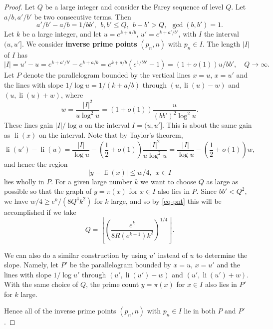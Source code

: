 \documentclass[10pt]{article}
\theoremstyle{definition}
\theoremstyle{remark}
\numberwithin{equation}{section}
\DeclareMathOperator{\li}{li}
\begin{document}
\begin{proof}
Let $Q$ be a large integer and
consider the Farey sequence of
level $Q$.  Let $a/b, a'/b'$ be two consecutive terms.  Then
\[
a'/b'-a/b = 1/bb',~~b,b'\le Q,~~b+b'>Q,~~\gcd(b,b')=1.
\]
Let $k$ be a large integer, and let
 $u=e^{k+a/b},\,u'=e^{k+a'/b'}$, with $I$ the interval $(u,u']$.  We consider \textbf{inverse prime points} $(p_n,n)$
with $p_n\in I$.   The length $|I|$ of $I$ has
\[
|I|=u'-u=e^{k+a'/b'}-e^{k+a/b}=e^{k+a/b}(e^{1/bb'}-1)=(1+o(1))u/bb', \quad Q\to\infty.
\]
Let $P$ denote the parallelogram bounded by the vertical lines $x=u,\, x=u'$
and the lines with slope $1/\log u=1/(k+a/b)$ through $(u, \li(u)-w)$ and $(u,\li(u)+w)$,
where
\[
w=\frac{|I|^2}{u\log^2u}=(1+o(1))\frac u{(bb')^2\log^2u}.
\]
These lines gain $|I|/\log u$ on the interval $I = (u,u']$.  This is about the same gain as
$\li(x)$ on the interval.  Note that by Taylor's theorem,
\[
\li(u')-\li(u)=\frac{|I|}{\log u}-\left(\frac12+o(1)\right)\frac{|I|^2}{u\log^2 u}=\frac{|I|}{\log u}-\left(\frac12+o(1)\right)w,
\]
and hence the region
\[
    |y-\li(x)|\le w/4,~~x\in I
\]
lies wholly in $P$.
For a given large number $k$ we want to choose $Q$ as large as possible so that the graph of $y=\pi(x)$ for $x\in I$ also lies in $P$.
Since $bb'<Q^2$, we have $w/4 \geq e^k / (8Q^4 k^2)$ for $k$ large, and so by \eqref{eq-pnt} this will be accomplished if we take
\[
Q=\left\lfloor \left(\frac{e^k}{8R(e^{k+1})k^2}\right)^{1/4}\right\rfloor.
\]

We can also do a similar construction by using $u'$ instead of $u$ to determine the slope.
Namely, let $P'$ be the parallelogram bounded by
$x=u,\,x=u'$ and the lines with slope $1/\log u'$ through $(u',\li(u')- w)$ and $(u',\li(u')+ w)$.
With the same choice of $Q$, the prime count $y=\pi(x)$ for $x\in I$ also lies in $P'$ for $k$ large.

Hence all of the inverse prime points $(p_n,n)$ with $p_n\in I$ lie in both $P$ and $P'$.  


\end{proof}
\end{document}
